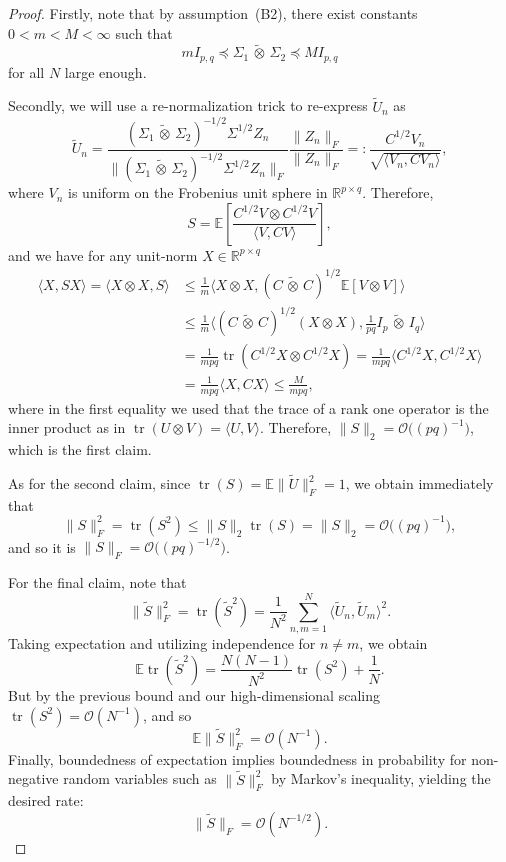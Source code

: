 \documentclass[12pt]{article}
\newcommand{\E}{\mathbb{E}}
\newcommand{\R}{\mathbb{R}}
\newcommand{\tr}{\operatorname{tr}}
\newcommand{\ot}{\,\tilde\otimes\,}
\begin{document}
\begin{proof}
Firstly, note that by assumption~(B2), there exist constants \(0<m<M<\infty\) such that
\[
mI_{p,q}\preceq \Sigma_{1}\ot\Sigma_{2}\preceq M I_{p,q}
\]
for all $N$ large enough.

Secondly, we will use a re-normalization trick to re-express $\widetilde{U}_n$ as
\[
\widetilde{U}_n = \frac{(\Sigma_1 \ot \Sigma_2)^{-1/2} \Sigma^{1/2} Z_n}{\| (\Sigma_1 \ot \Sigma_2)^{-1/2} \Sigma^{1/2} Z_n\|_F} \frac{\|Z_n\|_F}{\|Z_n\|_F} =: \frac{C^{1/2} V_n}{\sqrt{\langle V_n, C V_n\rangle}}, 
\]
where $V_n$ is uniform on the Frobenius unit sphere in $\R^{p\times q}$. Therefore,
\[
S = \E\left[ \frac{C^{1/2}V \otimes C^{1/2}V}{\langle V, C V\rangle}\right],
\]
and we have for any unit-norm $X \in \R^{p \times q}$
\[
\begin{split}
\langle X, S X\rangle = \langle X \otimes X, S\rangle &\leq \frac{1}{m} \langle X \otimes X , (C \ot C)^{1/2} \E[V \otimes V] \rangle  \\
&\leq \frac{1}{m} \langle (C \ot C)^{1/2} (X \otimes X) ,  \frac{1}{pq} I_{p}\ot I_q \rangle\\
&= \frac{1}{mpq} \tr(C^{1/2}X \otimes C^{1/2}X) = \frac{1}{mpq} \langle C^{1/2}X, C^{1/2}X \rangle \\
&=\frac{1}{mpq} \langle X,CX \rangle \leq \frac{M}{mpq},
\end{split}
\]
where in the first equality we used that the trace of a rank one operator is the inner product as in $\tr(U \otimes V) = \langle U,V\rangle$.
Therefore, $\|S\|_{2} = \mathcal O\big( (pq)^{-1} \big)$, which is the first claim.

As for the second claim, since $\tr(S) = \E \|\widetilde{U}\|_F^2=1$, we obtain immediately that
\[
\|S\|_F^2=\tr(S^2)\le \|S\|_{2}\tr(S)=\|S\|_{2}=\mathcal O\big( (pq)^{-1} \big),
\]
and so it is $\|S\|_F = \mathcal O\big( (pq)^{-1/2} \big)$.

For the final claim, note that
\[
\| \widetilde S\|_F^2 = \tr(\widetilde S^2) = \frac{1}{N^2} \sum_{n,m=1}^N \langle \widetilde{U}_n,\widetilde{U}_m \rangle^2.
\]
Taking expectation and utilizing independence for $n \neq m$, we obtain
\[
\E \tr(\widetilde{S}^2) = \frac{N(N-1)}{N^2}\tr(S^2) + \frac{1}{N}.
\]
But by the previous bound and our high-dimensional scaling $\tr(S^2) = \mathcal{O}(N^{-1})$, and so
\[
\E \|\widetilde{S}\|_F^2 = \mathcal{O}(N^{-1}).
\]
Finally, boundedness of expectation implies boundedness in probability for non-negative random variables such as $\|\widetilde{S}\|_F^2$ by Markov's inequality, yielding the desired rate:
\[
\|\widetilde{S}\|_F = \mathcal{O}(N^{-1/2}).
\]
\end{proof}
\end{document}
